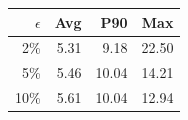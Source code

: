 \begin{tabular}{rrrr}
\hline
$\epsilon$ & Avg & P90 & Max\\
\hline
2\% & 5.31 & 9.18 & 22.50\\
5\% & 5.46 & 10.04 & 14.21\\
10\% & 5.61 & 10.04 & 12.94\\
\hline
\end{tabular}
